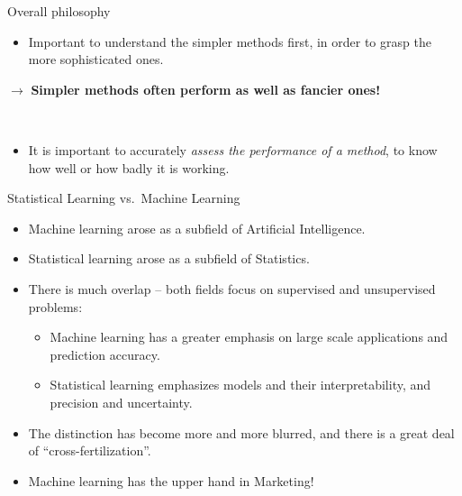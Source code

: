 \documentclass[
  ignorenonframetext,
]{beamer}
\providecommand{\tightlist}{%
  \setlength{\itemsep}{0pt}\setlength{\parskip}{0pt}}
\begin{document}
\begin{frame}{Overall philosophy}
\protect\hypertarget{overall-philosophy}{}
\begin{itemize}
\tightlist
\item
  Important to understand the simpler methods first, in order to grasp
  the more sophisticated ones.
\end{itemize}

\(\rightarrow\) \textbf{Simpler methods often perform as well as fancier
ones!}

\(~\)

\begin{itemize}
\tightlist
\item
  It is important to accurately \emph{assess the performance of a
  method}, to know how well or how badly it is working.
\end{itemize}
\end{frame}

\begin{frame}{Statistical Learning vs.~Machine Learning}
\protect\hypertarget{statistical-learning-vs.-machine-learning}{}
\begin{itemize}
\item
  Machine learning arose as a subfield of Artificial Intelligence.
\item
  Statistical learning arose as a subfield of Statistics.
\item
  There is much overlap -- both fields focus on supervised and
  unsupervised problems:

  \begin{itemize}
  \tightlist
  \item
    Machine learning has a greater emphasis on large scale applications
    and prediction accuracy.
  \item
    Statistical learning emphasizes models and their interpretability,
    and precision and uncertainty.
  \end{itemize}
\item
  The distinction has become more and more blurred, and there is a great
  deal of ``cross-fertilization''.
\item
  Machine learning has the upper hand in Marketing!
\end{itemize}
\end{frame}
\end{document}
